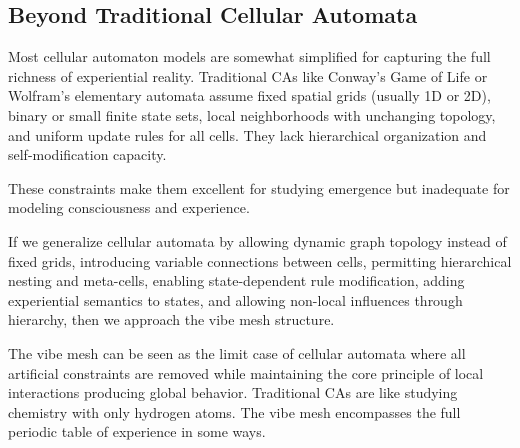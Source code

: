 \subsection{Beyond Traditional Cellular Automata}

Most cellular automaton models are somewhat simplified for capturing the full richness of experiential reality. Traditional CAs like Conway's Game of Life or Wolfram's elementary automata assume fixed spatial grids (usually 1D or 2D), binary or small finite state sets, local neighborhoods with unchanging topology, and uniform update rules for all cells. They lack hierarchical organization and self-modification capacity.

These constraints make them excellent for studying emergence but inadequate for modeling consciousness and experience.

\begin{theorem}
If we generalize cellular automata by allowing dynamic graph topology instead of fixed grids, introducing variable connections between cells, permitting hierarchical nesting and meta-cells, enabling state-dependent rule modification, adding experiential semantics to states, and allowing non-local influences through hierarchy, then we approach the vibe mesh structure.
\end{theorem}

The vibe mesh can be seen as the limit case of cellular automata where all artificial constraints are removed while maintaining the core principle of local interactions producing global behavior. Traditional CAs are like studying chemistry with only hydrogen atoms. The vibe mesh encompasses the full periodic table of experience in some ways.

